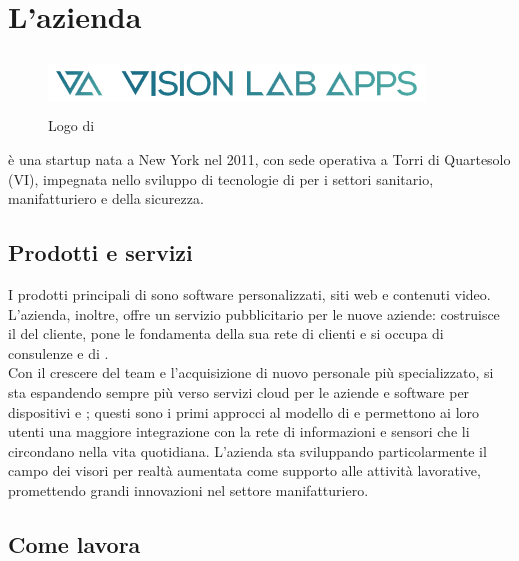 \chapter{L'azienda\label{cap:lazienda}}
\begin{figure}[H]
   \begin{center}
      \includegraphics[width=10cm,height=1.5cm,keepaspectratio]{immagini/vla-logo}
   \end{center}
   \caption{Logo di \nomeAzienda{}}\label{logovla}
\end{figure}
\nomeAziendaComm{} è una startup nata a New York nel 2011, con sede operativa a Torri di Quartesolo (VI), impegnata nello sviluppo di tecnologie di  per i settori sanitario, manifatturiero e della sicurezza.

\section{Prodotti e servizi}
I prodotti principali di \nomeAzienda{} sono software personalizzati, siti web e contenuti video. L'azienda, inoltre, offre un servizio pubblicitario per le nuove aziende: costruisce il  del cliente, pone le fondamenta della sua rete di clienti e si occupa di consulenze e di .
\\
Con il crescere del team e l'acquisizione di nuovo personale più specializzato, \nomeAzienda{} si sta espandendo sempre più verso servizi cloud per le aziende e software per dispositivi  e ; questi sono i primi approcci al modello di  e permettono ai loro utenti una maggiore integrazione con la rete di informazioni e sensori che li circondano nella vita quotidiana. L'azienda sta sviluppando particolarmente il campo dei visori per realtà aumentata come supporto alle attività lavorative, promettendo grandi innovazioni nel settore manifatturiero.

\section{Come lavora}
 
